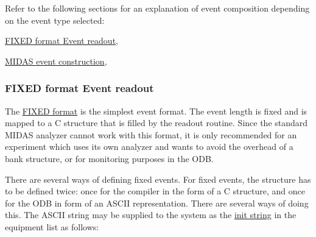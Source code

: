 Refer to the following sections for an explanation of event composition depending on the event type selected:
\begin{DoxyItemize}
\item \hyperlink{FE_bank_construction_FE_FIXED_event_readout}{FIXED format Event readout},
\item \hyperlink{FE_bank_construction_FE_MIDAS_event_construction}{MIDAS event construction},
\end{DoxyItemize}

\par
 

 \par
 \label{FE_bank_construction_idx_format_FIXED}
\hypertarget{FE_bank_construction_idx_format_FIXED}{}
 \label{FE_bank_construction_idx_event_readout_format_fixed}
\hypertarget{FE_bank_construction_idx_event_readout_format_fixed}{}
\hypertarget{FE_bank_construction_FE_FIXED_event_readout}{}\subsubsection{FIXED format Event readout}\label{FE_bank_construction_FE_FIXED_event_readout}
The \hyperlink{FE_table_FE_tbl_Format}{FIXED format} is the simplest event format. The event length is fixed and is mapped to a C structure that is filled by the readout routine. Since the standard MIDAS analyzer cannot work with this format, it is only recommended for an experiment which uses its own analyzer and wants to avoid the overhead of a bank structure, or for monitoring purposes in the ODB.

\par
 There are several ways of defining fixed events. For fixed events, the structure has to be defined twice: once for the compiler in the form of a C structure, and once for the ODB in form of an ASCII representation. There are several ways of doing this. The ASCII string may be supplied to the system as the \hyperlink{FE_table_FE_tbl_InitString}{init string} in the equipment list as follows:

